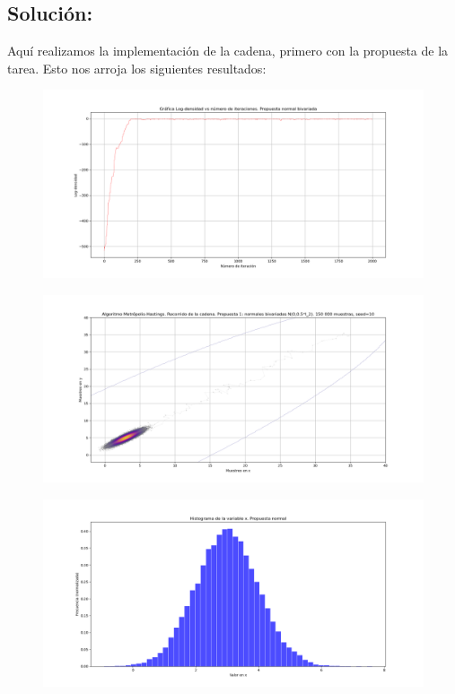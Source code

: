 \documentclass[letterpaper]{article}
\newcommand{\1}{\mathds{1}}
\theoremstyle{definition}
\theoremstyle{definition}
\theoremstyle{definition}
\theoremstyle{definition}
\theoremstyle{definition}
\begin{document}
    \subsection*{Solución:}
    Aquí realizamos la implementación de la cadena, primero con la propuesta de la tarea. Esto nos arroja los siguientes resultados:
    \begin{figure}[h!]
        \centering
        \includegraphics[width=\linewidth]{23.png}
        \caption{}
    \end{figure} 
    \begin{figure}[h!]
        \centering
        \includegraphics[width=\linewidth]{24.png}
        \caption{}
    \end{figure} 
    \begin{figure}[h!]
        \centering
        \includegraphics[width=\linewidth]{25.png}
        \caption{}
    \end{figure} 
\end{document}
